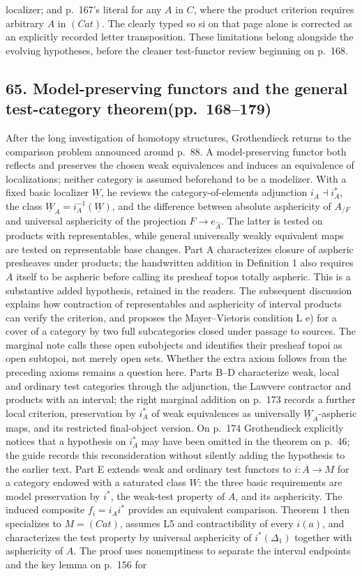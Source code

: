 \documentclass[10pt,oneside]{book}
\begin{document}
localizer; and p.~167's literal for any $A$ in $C$, where the product criterion requires arbitrary $A$ in $(Cat)$. The clearly typed so si on that page alone is corrected as an explicitly recorded letter transposition. These limitations belong alongside the evolving hypotheses, before the cleaner test-functor review beginning on p.~168.

\subsection*{65. Model-preserving functors and the general test-category theorem\newline (pp.~168--179)}
After the long investigation of homotopy structures, Grothendieck returns to the comparison problem announced around p.~88. A model-preserving functor both reflects and preserves the chosen weak equivalences and induces an equivalence of localizations; neither category is assumed beforehand to be a modelizer. With a fixed basic localizer $\underline W$, he reviews the category-of-elements adjunction $i_A\dashv i_A^*$, the class $\underline W_A=i_A^{-1}(\underline W)$, and the difference between absolute asphericity of $A_{/F}$ and universal asphericity of the projection $F\to e_{\widehat A}$. The latter is tested on products with representables, while general universally weakly equivalent maps are tested on representable base changes. Part A characterizes closure of aspheric presheaves under products; the handwritten addition in Definition 1 also requires $A$ itself to be aspheric before calling its presheaf topos totally aspheric. This is a substantive added hypothesis, retained in the readers. The subsequent discussion explains how contraction of representables and asphericity of interval products can verify the criterion, and proposes the Mayer--Vietoris condition L e) for a cover of a category by two full subcategories closed under passage to sources. The marginal note calls these open subobjects and identifies their presheaf topoi as open subtopoi, not merely open sets. Whether the extra axiom follows from the preceding axioms remains a question here. Parts B--D characterize weak, local and ordinary test categories through the adjunction, the Lawvere contractor and products with an interval; the right marginal addition on p.~173 records a further local criterion, preservation by $i_A^*$ of weak equivalences as universally $\underline W_A$-aspheric maps, and its restricted final-object version. On p.~174 Grothendieck explicitly notices that a hypothesis on $i_A^*$ may have been omitted in the theorem on p.~46; the guide records this reconsideration without silently adding the hypothesis to the earlier text. Part E extends weak and ordinary test functors to $i:A\to M$ for a category endowed with a saturated class $W$: the three basic requirements are model preservation by $i^*$, the weak-test property of $A$, and its asphericity. The induced composite $f_i=i_Ai^*$ provides an equivalent comparison. Theorem 1 then specializes to $M=(Cat)$, assumes L5 and contractibility of every $i(a)$, and characterizes the test property by universal asphericity of $i^*(\Delta_1)$ together with asphericity of $A$. The proof uses nonemptiness to separate the interval endpoints and the key lemma on p.~156 for 
\end{document}
